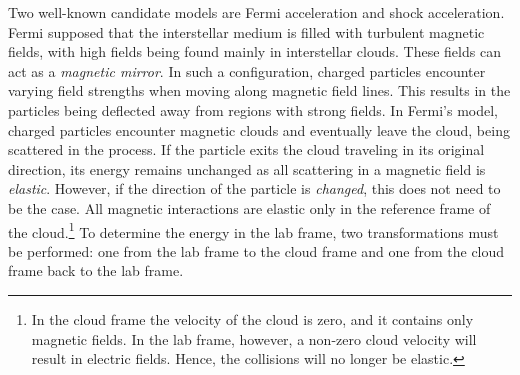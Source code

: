 Two well-known candidate models are Fermi acceleration and shock acceleration.  Fermi
supposed \cite{Fermi:1949} that the interstellar medium is filled with turbulent
magnetic fields, with high fields being found mainly in interstellar clouds.
These fields can act as a \emph{magnetic mirror}.  In such a configuration,
charged particles encounter varying field strengths when moving along magnetic
field lines.  This results in the particles being deflected away from regions
with strong fields.  In Fermi's model, charged particles encounter magnetic
clouds and eventually leave the cloud, being scattered in the process.  If the
particle exits the cloud traveling in its original direction, its energy remains
unchanged as all scattering in a magnetic field is \emph{elastic}.  However,
if the direction of the particle is \emph{changed}, this does not need to be the
case.
All magnetic interactions are elastic only in the reference frame of the
cloud.\footnote{In the cloud frame the velocity of the cloud is zero, and it
contains only magnetic fields. In the lab frame, however, a non-zero cloud
velocity will result in electric fields. Hence, the collisions will no longer
be elastic.} To determine the energy in the lab frame, two
transformations must be performed: one from the lab frame to the cloud frame and
one from the cloud frame back to the lab frame.

